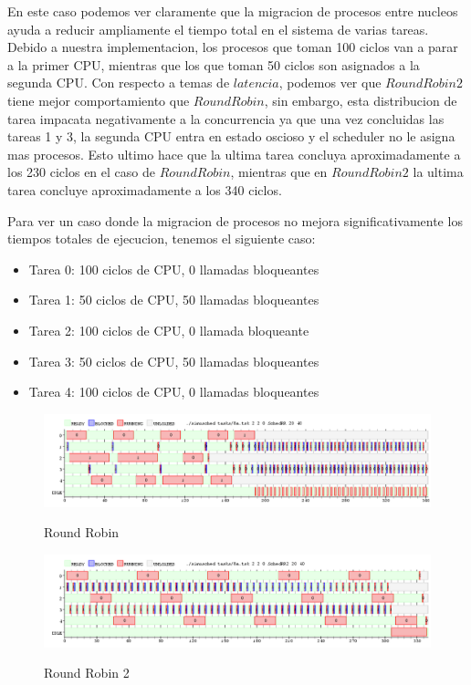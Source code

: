 \pagebreak

En este caso podemos ver claramente que la migracion de procesos entre nucleos ayuda a reducir ampliamente el tiempo total en el sistema de varias tareas. Debido a nuestra implementacion, los procesos que toman 100 ciclos van a parar a la primer CPU, mientras que los que toman 50 ciclos son asignados a la segunda CPU. Con respecto a temas de $latencia$, podemos ver que $Round Robin 2$ tiene mejor comportamiento que $Round Robin$, sin embargo, esta distribucion de tarea impacata negativamente a la concurrencia ya que una vez concluidas las tareas 1 y 3, la segunda CPU entra en estado oscioso y el scheduler no le asigna mas procesos. Esto ultimo hace que la ultima tarea concluya aproximadamente a los 230 ciclos en el caso de $Round Robin$, mientras que en $Round Robin 2$ la ultima tarea concluye aproximadamente a los 340 ciclos.

Para ver un caso donde la migracion de procesos no mejora significativamente los tiempos totales de ejecucion, tenemos el siguiente caso:

\begin{itemize}
	\item Tarea 0: 100 ciclos de CPU, 0 llamadas bloqueantes
	\item Tarea 1: 50 ciclos de CPU, 50 llamadas bloqueantes
	\item Tarea 2: 100 ciclos de CPU, 0 llamada bloqueante
	\item Tarea 3: 50 ciclos de CPU, 50 llamadas bloqueantes
	\item Tarea 4: 100 ciclos de CPU, 0 llamadas bloqueantes
\end{itemize}

\begin{figure}[h]
    \includegraphics[width=\linewidth]{images/8a_quantumRR.png}
    \label{fig:Task Consola}
    \caption{Round Robin}
\end{figure}

\pagebreak

\begin{figure}[h]
    \includegraphics[width=\linewidth]{images/8a_quantumRR2.png}
    \label{fig:Task Consola}
    \caption{Round Robin 2}
\end{figure}

